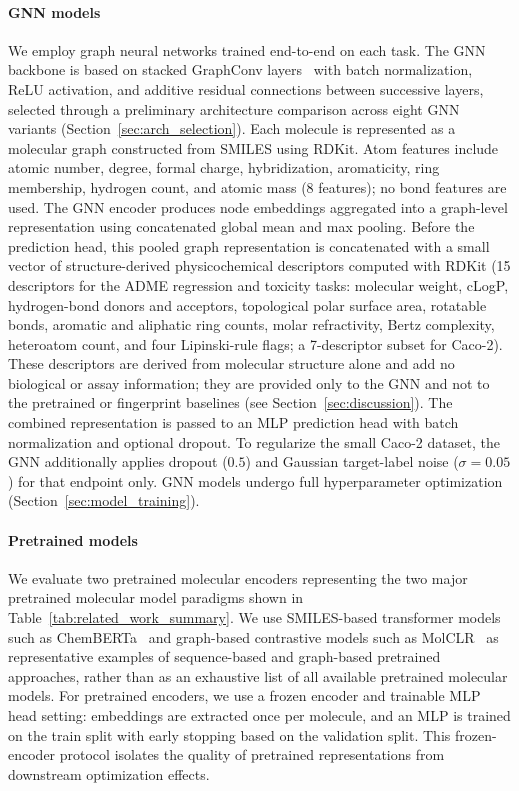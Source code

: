 \documentclass[journal]{IEEEtran}
\begin{document}
\paragraph{GNN models}
We employ graph neural networks trained end-to-end on each task. The GNN backbone is based on stacked GraphConv layers~\cite{morris2019wlgnn} with batch normalization, ReLU activation, and additive residual connections between successive layers, selected through a preliminary architecture comparison across eight GNN variants (Section~\ref{sec:arch_selection}). Each molecule is represented as a molecular graph constructed from SMILES using RDKit. Atom features include atomic number, degree, formal charge, hybridization, aromaticity, ring membership, hydrogen count, and atomic mass (8 features); no bond features are used. The GNN encoder produces node embeddings aggregated into a graph-level representation using concatenated global mean and max pooling. Before the prediction head, this pooled graph representation is concatenated with a small vector of structure-derived physicochemical descriptors computed with RDKit (15 descriptors for the ADME regression and toxicity tasks: molecular weight, cLogP, hydrogen-bond donors and acceptors, topological polar surface area, rotatable bonds, aromatic and aliphatic ring counts, molar refractivity, Bertz complexity, heteroatom count, and four Lipinski-rule flags; a 7-descriptor subset for Caco-2). These descriptors are derived from molecular structure alone and add no biological or assay information; they are provided only to the GNN and not to the pretrained or fingerprint baselines (see Section~\ref{sec:discussion}). The combined representation is passed to an MLP prediction head with batch normalization and optional dropout. To regularize the small Caco-2 dataset, the GNN additionally applies dropout ($0.5$) and Gaussian target-label noise ($\sigma=0.05$) for that endpoint only. GNN models undergo full hyperparameter optimization (Section~\ref{sec:model_training}).

\paragraph{Pretrained models}
We evaluate two pretrained molecular encoders representing the two major pretrained molecular model paradigms shown in Table~\ref{tab:related_work_summary}. We use SMILES-based transformer models such as ChemBERTa~\cite{chemberta2} and graph-based contrastive models such as MolCLR~\cite{molclr} as representative examples of sequence-based and graph-based pretrained approaches, rather than as an exhaustive list of all available pretrained molecular models. For pretrained encoders, we use a frozen encoder and trainable MLP head setting: embeddings are extracted once per molecule, and an MLP is trained on the train split with early stopping based on the validation split. This frozen-encoder protocol isolates the quality of pretrained representations from downstream optimization effects.
\end{document}

